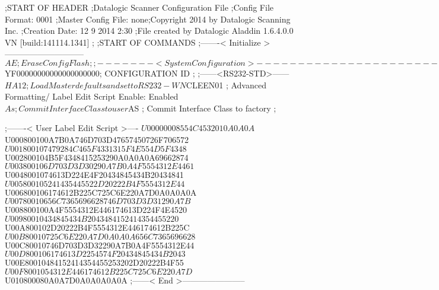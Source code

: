 ;START OF HEADER
;Datalogic Scanner Configuration File
;Config File Format: 0001
;Master Config File: none;Copyright 2014 by Datalogic Scanning Inc.
;Creation Date: 12 9 2014 2:30
;File created by Datalogic Aladdin 1.6.4.0.0 VN [build:141114.1341]
;
;START OF COMMANDS
;-------< Initialize >-----------------------------
$AE                 ; Erase Config Flash
;
;-------< System Configuration >-------------------------------
$YF00000000000000000000; CONFIGURATION ID
;
;------<RS232-STD>------
$HA12               ; Load Master defaults and set to RS232-WN
$CLEEN01            ; Advanced Formatting/ Label Edit Script Enable: Enabled
$As                 ; Commit Interface Class to user
$AS                 ; Commit Interface Class to factory
;

;-------< User Label Edit Script >----
$U00000008554C4532010A0A0A
$U000800100A7B0A746D703D47657450726F706572
$U001800107479284C465F4331315F4E554D5F4348
$U002800104B5F4348415253290A0A0A0A69662874
$U003800106D703D3D30290A7B0A4F5554312E4461
$U0048001074613D224E4F20434845434B20434841
$U005800105241435445522D20222B4F5554312E44
$U006800106174612B225C725C6E220A7D0A0A0A0A
$U00780010656C7365696628746D703D3D31290A7B
$U008800100A4F5554312E446174613D224F4E4520
$U00980010434845434B2043484152414354455220
$U00A800102D20222B4F5554312E446174612B225C
$U00B80010725C6E220A7D0A0A0A656C7365696628
$U00C80010746D703D3D32290A7B0A4F5554312E44
$U00D800106174613D2254574F20434845434B2043
$U00E80010484152414354455253202D20222B4F55
$U00F8001054312E446174612B225C725C6E220A7D
$U010800080A0A7D0A0A0A0A0A
;------< End >-----------------------
